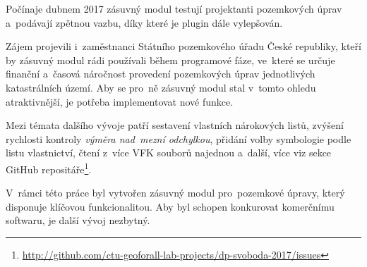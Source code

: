 Počínaje dubnem 2017 zásuvný modul testují projektanti pozemkových
úprav a~podávají zpětnou vazbu, díky které je plugin dále vylepšován.

Zájem projevili i~zaměstnanci Státního pozemkového úřadu České
republiky, kteří by zásuvný modul rádi používali během programové
fáze, ve~které se určuje finanční a~časová náročnost provedení
pozemkových úprav jednotlivých katastrálních území. Aby se pro~ně
zásuvný modul stal v~tomto ohledu atraktivnější, je potřeba
implementovat nové funkce.

Mezi témata dalšího vývoje patří sestavení vlastních nárokových listů,
zvýšení rychlosti kontroly \textit{výměra nad~mezní odchylkou},
přidání volby symbologie podle listu vlastnictví, čtení z~více VFK
souborů najednou a~další, více viz sekce GitHub
repositáře\footnote{\url{http://github.com/ctu-geoforall-lab-projects/dp-svoboda-2017/issues}}.

V~rámci této práce byl vytvořen zásuvný modul pro~pozemkové úpravy,
který disponuje klíčovou funkcionalitou. Aby byl schopen konkurovat
komerčnímu softwaru, je další vývoj nezbytný.
